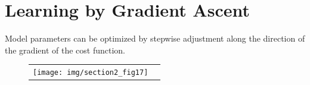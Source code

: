 

\section{Learning by Gradient Ascent}


\begin{frame}{\secname}
Model parameters can be optimized by stepwise adjustment along the direction of the gradient of the cost function. 

\begin{figure}[h]
  \centering
  \begin{tabular}[c c]{c c}
   \texttt{[image: img/section2\_fig17]}
  &\raisebox{2cm}{$\Delta \mathrm{w}_{ij} = \underbrace{ \eta }_{
    \substack{ \text{learning} \\ \text{rate}} }
  \frac{\partial E^T}{\partial \mathrm{w}_{ij}}$}
  \end{tabular}  
  \label{fig:gradientDescent}
\end{figure}

\end{frame}

